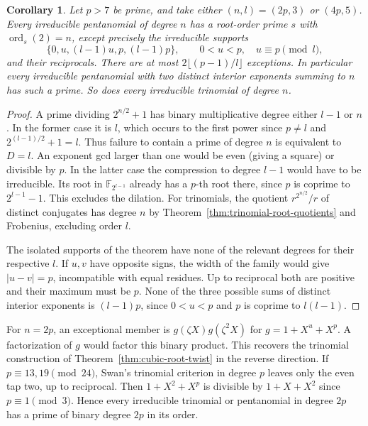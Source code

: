 \documentclass[11pt]{article}
\newtheorem{corollary}[theorem]{Corollary}
\begin{document}
\begin{corollary}\label{cor:two-four-prime}
Let \(p>7\) be prime, and take either \((n,l)=(2p,3)\) or
\((4p,5)\). Every irreducible pentanomial of degree \(n\) has
a root-order prime \(s\) with \(\operatorname{ord}_s(2)=n\), except
precisely the irreducible supports
\[
       \{0,u,(l-1)u,p,(l-1)p\},\qquad
       0<u<p,\quad u\equiv p\pmod l ,
\]
and their reciprocals. There are at most
\(2\lfloor(p-1)/l\rfloor\) exceptions. In particular every
irreducible pentanomial with two distinct interior exponents
summing to \(n\) has such a prime. So does every irreducible
trinomial of degree \(n\).
\end{corollary}
\begin{proof}
A prime dividing \(2^{n/2}+1\) has binary multiplicative degree
either \(l-1\) or \(n\). In the former case it is \(l\), which
occurs to the first power since \(p\ne l\) and
\(2^{(l-1)/2}+1=l\). Thus failure to contain a prime of
degree \(n\) is equivalent to \(D=l\). An exponent gcd larger
than one would be even (giving a square) or divisible by \(p\).
In the latter case the compression to degree \(l-1\) would have
to be irreducible. Its root in \(\mathbb F_{2^{l-1}}\) already
has a \(p\)-th root there, since \(p\) is coprime to \(2^{l-1}-1\).
This excludes the dilation. For trinomials, the quotient
\(r^{2^{n/2}}/r\) of distinct conjugates has degree \(n\) by
Theorem~\ref{thm:trinomial-root-quotients} and Frobenius, excluding
order \(l\).

The isolated supports of the theorem have none of the relevant
degrees for their respective \(l\). If \(u,v\) have opposite signs,
the width of the family would give \(|u-v|=p\), incompatible with
equal residues. Up to reciprocal both are positive and their maximum
must be \(p\). None of the three possible sums of distinct interior
exponents is \((l-1)p\), since \(0<u<p\) and \(p\) is coprime to
\(l(l-1)\).
\end{proof}

For \(n=2p\), an exceptional member is
\(g(\zeta X)g(\zeta^2X)\) for \(g=1+X^u+X^p\). A factorization of
\(g\) would factor this binary product. This recovers the trinomial
construction of Theorem~\ref{thm:cubic-root-twist} in the reverse
direction. If \(p\equiv13,19\pmod{24}\), Swan's trinomial criterion
in degree \(p\) leaves only the even tap two, up to reciprocal.
Then \(1+X^2+X^p\) is divisible by \(1+X+X^2\) since
\(p\equiv1\pmod3\). Hence every irreducible trinomial or pentanomial
in degree \(2p\) has a prime of binary degree \(2p\) in its order.
\end{document}
